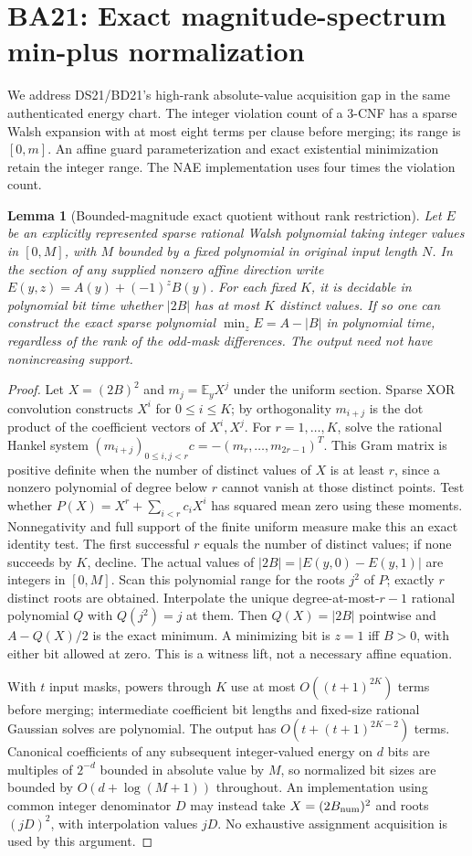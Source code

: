 \documentclass[11pt]{article}
\newtheorem{lemma}[theorem]{Lemma}
\begin{document}
\section{BA21: Exact magnitude-spectrum min-plus normalization}\label{sec:ba21}
We address DS21/BD21's high-rank absolute-value acquisition gap in the same authenticated energy chart. The integer violation count of a 3-CNF has a sparse Walsh expansion with at most eight terms per clause before merging; its range is $[0,m]$. An affine guard parameterization and exact existential minimization retain the integer range. The NAE implementation uses four times the violation count.
\begin{lemma}[Bounded-magnitude exact quotient without rank restriction]\label{lem:ba21-moment}
Let $E$ be an explicitly represented sparse rational Walsh polynomial taking integer values in $[0,M]$, with $M$ bounded by a fixed polynomial in original input length $N$. In the section of any supplied nonzero affine direction write $E(y,z)=A(y)+(-1)^zB(y)$. For each fixed $K$, it is decidable in polynomial bit time whether $|2B|$ has at most $K$ distinct values. If so one can construct the exact sparse polynomial $\min_z E=A-|B|$ in polynomial time, regardless of the rank of the odd-mask differences. The output need not have nonincreasing support.
\end{lemma}
\begin{proof}
Let $X=(2B)^2$ and $m_j=\mathbb E_y X^j$ under the uniform section. Sparse XOR convolution constructs $X^i$ for $0\le i\le K$; by orthogonality $m_{i+j}$ is the dot product of the coefficient vectors of $X^i,X^j$. For $r=1,\ldots,K$, solve the rational Hankel system $(m_{i+j})_{0\le i,j<r}c=-(m_r,\ldots,m_{2r-1})^T$. This Gram matrix is positive definite when the number of distinct values of $X$ is at least $r$, since a nonzero polynomial of degree below $r$ cannot vanish at those distinct points. Test whether $P(X)=X^r+\sum_{i<r}c_iX^i$ has squared mean zero using these moments. Nonnegativity and full support of the finite uniform measure make this an exact identity test. The first successful $r$ equals the number of distinct values; if none succeeds by $K$, decline. The actual values of $|2B|=|E(y,0)-E(y,1)|$ are integers in $[0,M]$. Scan this polynomial range for the roots $j^2$ of $P$; exactly $r$ distinct roots are obtained. Interpolate the unique degree-at-most-$r-1$ rational polynomial $Q$ with $Q(j^2)=j$ at them. Then $Q(X)=|2B|$ pointwise and $A-Q(X)/2$ is the exact minimum. A minimizing bit is $z=1$ iff $B>0$, with either bit allowed at zero. This is a witness lift, not a necessary affine equation.

With $t$ input masks, powers through $K$ use at most $O((t+1)^{2K})$ terms before merging; intermediate coefficient bit lengths and fixed-size rational Gaussian solves are polynomial. The output has $O(t+(t+1)^{2K-2})$ terms. Canonical coefficients of any subsequent integer-valued energy on $d$ bits are multiples of $2^{-d}$ bounded in absolute value by $M$, so normalized bit sizes are bounded by $O(d+\log(M+1))$ throughout. An implementation using common integer denominator $D$ may instead take $X=(2B_{\rm num})^2$ and roots $(jD)^2$, with interpolation values $jD$. No exhaustive assignment acquisition is used by this argument.
\end{proof}
\end{document}
